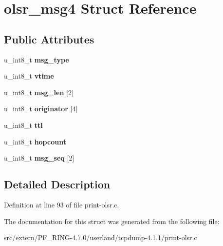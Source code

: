 \hypertarget{structolsr__msg4}{
\section{olsr\_\-msg4 Struct Reference}
\label{structolsr__msg4}
}
\subsection*{Public Attributes}
\begin{DoxyCompactItemize}
\item 
\hypertarget{structolsr__msg4_adb06fff9b42b975129bd2778d733cdf2}{
u\_\-int8\_\-t {\bfseries msg\_\-type}}
\label{structolsr__msg4_adb06fff9b42b975129bd2778d733cdf2}

\item 
\hypertarget{structolsr__msg4_a394a6d8c63236eb27f3471b8d86226aa}{
u\_\-int8\_\-t {\bfseries vtime}}
\label{structolsr__msg4_a394a6d8c63236eb27f3471b8d86226aa}

\item 
\hypertarget{structolsr__msg4_aeecc09efed5fc29dbfad8775bc5c3430}{
u\_\-int8\_\-t {\bfseries msg\_\-len} \mbox{[}2\mbox{]}}
\label{structolsr__msg4_aeecc09efed5fc29dbfad8775bc5c3430}

\item 
\hypertarget{structolsr__msg4_a4bb9130250898fa2caf505b39c7ef0a2}{
u\_\-int8\_\-t {\bfseries originator} \mbox{[}4\mbox{]}}
\label{structolsr__msg4_a4bb9130250898fa2caf505b39c7ef0a2}

\item 
\hypertarget{structolsr__msg4_ab1fd562ac05c757eee4f6fa496c1c824}{
u\_\-int8\_\-t {\bfseries ttl}}
\label{structolsr__msg4_ab1fd562ac05c757eee4f6fa496c1c824}

\item 
\hypertarget{structolsr__msg4_a0a27cc5f4c3ab4afb3061392e701ab37}{
u\_\-int8\_\-t {\bfseries hopcount}}
\label{structolsr__msg4_a0a27cc5f4c3ab4afb3061392e701ab37}

\item 
\hypertarget{structolsr__msg4_a7540a9faf37c06063c881e09a2a73989}{
u\_\-int8\_\-t {\bfseries msg\_\-seq} \mbox{[}2\mbox{]}}
\label{structolsr__msg4_a7540a9faf37c06063c881e09a2a73989}

\end{DoxyCompactItemize}


\subsection{Detailed Description}


Definition at line 93 of file print-\/olsr.c.



The documentation for this struct was generated from the following file:\begin{DoxyCompactItemize}
\item 
src/extern/PF\_\-RING-\/4.7.0/userland/tcpdump-\/4.1.1/print-\/olsr.c\end{DoxyCompactItemize}
